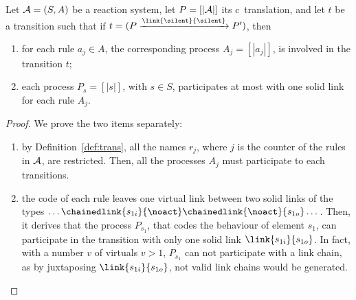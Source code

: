  
 \begin{lemma}
 \label{lem:allrules}
  Let ${\cal A} = (S, A)$ be a reaction system, let $P=[|{\cal A}|]$ its c\CNA~translation, and let $t$
be a transition such that  if $t= (P \xrightarrow{\link{\silent}{\silent}} P')$, then
  \begin{enumerate}
  \item for each rule  $a_j \in A$, the corresponding process $A_j = [|a_j|]$,  is involved in the transition $t$;
  \item each process $P_s = [|s|]$, with $s \in S$, participates at most  with one solid link for each rule $A_j$.%
  \end{enumerate}
  \end{lemma}
  \begin{proof}
  We prove the two items separately:
  \begin{enumerate}
\item by Definition~\ref{def:trans}, all the names $r_j$, where $j$ is the counter of the rules in ${\cal A}$, are restricted. Then, all the processes $A_j$ must participate to each transitions.
 \item the code of each rule leaves one virtual link between two solid links of the types $\dots\chainedlink{s_{1i}}{\noact}\chainedlink{\noact}{s_{1o}}\dots$. Then, it derives that the process $P_{s_1}$, that  codes the behaviour of element $s_1$, can participate in the transition with only one solid link $\link{s_{1i}}{s_{1o}}$. In fact, with a number $v$ of virtuals  $v > 1$, 
 $P_{s_1}$ can not participate with a link chain, as by juxtaposing  $\link{s_{1i}}{s_{1o}}$, not valid
 link chains would be generated.
    \end{enumerate}
  \end{proof}
 
